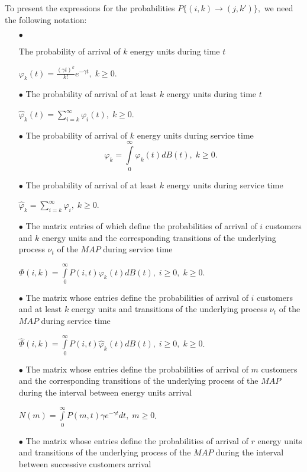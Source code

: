 \documentclass[runningheads]{llncs}
\begin{document}
To present the expressions for the probabilities $P\{(i,k) \to (j, k')\},$ we need the following
 notation:
\begin{itemize}
\item[$\bullet$]

The probability of arrival of $k$ energy units during time $t$

$\varphi_{k}(t) = \frac{(\gamma t)^{k} }{k!} e^{-\gamma t},\; k \geq 0$.

\item[$\bullet$]
The probability of arrival of at least $k$ energy units during time $t$

$ \hat\varphi_{k}(t) = \sum\limits_{i=k}^{\infty} \varphi_{i}(t),\; k \geq 0$.

\item[$\bullet$]
The probability of arrival of $k$ energy units during service time
$$ \varphi_{k} =   \int\limits_{0}^{\infty}\varphi_{k}(t)dB(t),\; k \geq 0.$$

\item[$\bullet$]
The probability of arrival of at least $k$ energy units during service time

$ \hat\varphi_{k} = \sum\limits_{i=k}^{\infty} \varphi_{i},\; k \geq 0$.

\item[$\bullet$]
The matrix entries of which define the probabilities of arrival of $i$ customers and  $k$ energy units and the corresponding transitions of the underlying process $\nu_t$ of the $MAP$ during service time

$ \Phi(i,k) =  \int\limits_{0}^{\infty} P(i,t)\varphi_{k}(t)dB(t),\; i \geq 0,\; k \geq 0$.

\item[$\bullet$] The matrix whose entries  define the probabilities of arrival of $i$ customers and at least $k$ energy units and transitions of the underlying process $\nu_t$ of the $MAP$ during service time

$ \hat\Phi(i, k) = \int\limits_{0}^{\infty}  P(i, t) \hat\varphi_{k}(t)dB(t),\; i \geq 0,\; k \geq 0$.

\item[$\bullet$]
The matrix whose entries  define the probabilities of arrival of $m$ customers  and  the corresponding  transitions of the underlying process  of the $MAP$ during  the interval between energy units arrival

$ N(m) = \int\limits_{0}^{\infty} P(m, t)\gamma e^{-\gamma t}dt,\; m \ge 0$.

\item[$\bullet$]
The matrix whose entries  define the probabilities of arrival of $r$ energy units  and transitions of the underlying process  of the $MAP$ during  the interval between successive customers arrival


\end{itemize}
\end{document}
